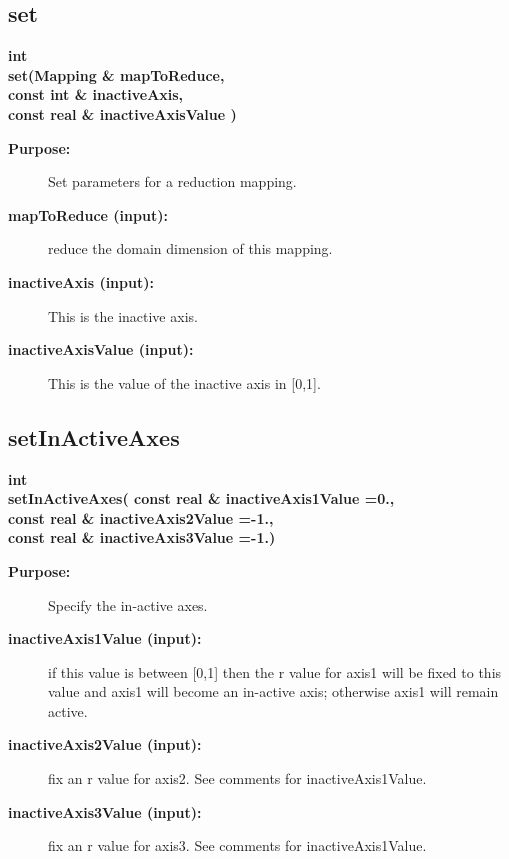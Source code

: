 \subsection{set}
 
\begin{flushleft} \textbf{%
int   \\ 
\settowidth{\ReductionMappingIncludeArgIndent}{set(}%
set(Mapping \& mapToReduce,\\ 
\hspace{\ReductionMappingIncludeArgIndent}const int \& inactiveAxis,\\ 
\hspace{\ReductionMappingIncludeArgIndent}const real \& inactiveAxisValue ) 
}\end{flushleft}
\begin{description}
\item[{\bf Purpose:}]  Set parameters for a reduction mapping.

\item[{\bf mapToReduce (input):}]  reduce the domain dimension of this mapping.
\item[{\bf inactiveAxis (input):}]  This is the inactive axis.
\item[{\bf inactiveAxisValue (input):}]  This is the value of the inactive axis in [0,1].

\end{description}
\subsection{setInActiveAxes}
 
\begin{flushleft} \textbf{%
int  \\ 
\settowidth{\ReductionMappingIncludeArgIndent}{setInActiveAxes(}%
setInActiveAxes( const real \& inactiveAxis1Value  =0.,\\ 
\hspace{\ReductionMappingIncludeArgIndent}const real \& inactiveAxis2Value  =-1.,\\ 
\hspace{\ReductionMappingIncludeArgIndent}const real \& inactiveAxis3Value  =-1.)
}\end{flushleft}
\begin{description}
\item[{\bf Purpose:}]  Specify the in-active axes.

\item[{\bf inactiveAxis1Value (input):}]  if this value is between [0,1] then the r value
      for axis1 will be fixed to this value and axis1 will become an in-active axis;
       otherwise axis1 will remain active.
\item[{\bf inactiveAxis2Value (input):}]  fix an r value for axis2. See comments for inactiveAxis1Value.
\item[{\bf inactiveAxis3Value (input):}]  fix an r value for axis3. See comments for inactiveAxis1Value.
\end{description}
